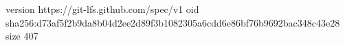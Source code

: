 version https://git-lfs.github.com/spec/v1
oid sha256:d73af5f2b9da8b04d2ee2d89f3b1082305a6cdd6e86bf76b9692bac348c43e28
size 407
